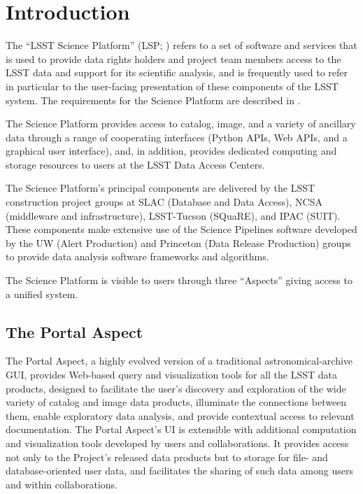 \section{Introduction}\label{introduction}

The ``LSST Science Platform'' (LSP; ) refers to a set of software and services that is used to provide data rights holders and project team members access to the LSST data and support for its scientific analysis, and is frequently used to refer in particular to the user-facing presentation of these components of the LSST system.
The requirements for the Science Platform are described in .

The Science Platform provides access to catalog, image, and a variety of ancillary data through a range of cooperating interfaces (Python APIs, Web APIs, and a graphical user interface),
and, in addition, provides dedicated computing and storage resources to users at the LSST Data Access Centers.

The Science Platform's principal components are delivered by the LSST construction project groups at SLAC (Database and Data Access), NCSA (middleware and infrastructure), LSST-Tucson (SQuaRE), and IPAC (SUIT).  These components make extensive use of the Science Pipelines software developed by the UW (Alert Production) and Princeton (Data Release Production) groups to provide data analysis software frameworks and algorithms.

The Science Platform is visible to users through three ``Aspects'' giving access to a unified system.


\subsection{The Portal Aspect}\label{portal-aspect-intro}

The Portal Aspect, a highly evolved version of a traditional astronomical-archive GUI, provides Web-based query and visualization tools for all the LSST data products, designed to facilitate the user's discovery and exploration of the wide variety of catalog and image data products, illuminate the connections between them, enable exploratory data analysis, and provide contextual access to relevant documentation.
The Portal Aspect's UI is extensible with additional computation and visualization tools developed by users and collaborations.
It provides access not only to the Project's released data products but to storage for file- and database-oriented user data, and facilitates the sharing of such data among users and within collaborations.

